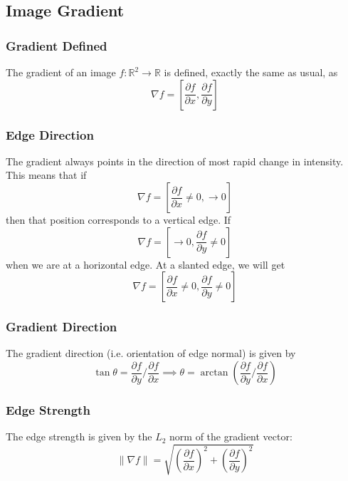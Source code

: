\documentclass[11pt]{article}
\newcommand{\real}{\mathbb{R}}
\begin{document}
\subsection{Image Gradient}
\subsubsection{Gradient Defined}
The gradient of an image $f: \real ^2 \rightarrow \real$ is defined, exactly the same as usual, as
\begin{equation}
	\nabla f=\left[\frac{\partial f}{\partial x}, \frac{\partial f}{\partial y}\right]
\end{equation}

\subsubsection{Edge Direction}
The gradient always points in the direction of most rapid change in intensity. This means that if
\begin{equation}
	\nabla f=\left[\frac{\partial f}{\partial x} \neq 0, \rightarrow 0\right]
\end{equation}
then that position corresponds to a vertical edge. If 
\begin{equation}
	\nabla f = \left[ \rightarrow 0, \frac{\partial f}{\partial y} \neq 0 \right]
\end{equation}
when we are at a horizontal edge. At a slanted edge, we will get
\begin{equation}
	\nabla f=\left[\frac{\partial f}{\partial x} \neq 0 , \frac{\partial f}{\partial y} \neq 0 \right]
\end{equation}

\subsubsection{Gradient Direction}
The gradient direction (i.e. orientation of edge normal) is given by
\begin{equation}
	\tan  \theta = \frac{\partial f}{\partial y} / \frac{\partial f}{\partial x} \implies \theta = \arctan \left(\frac{\partial f}{\partial y} / \frac{\partial f}{\partial x}\right)
\end{equation}

\subsubsection{Edge Strength}
The edge strength is given by the $L_2$ norm of the gradient vector:  
\begin{equation}
	\|\nabla f\|=\sqrt{\left(\frac{\partial f}{\partial x}\right)^{2}+\left(\frac{\partial f}{\partial y}\right)^{2}} 
\end{equation}
\end{document}
